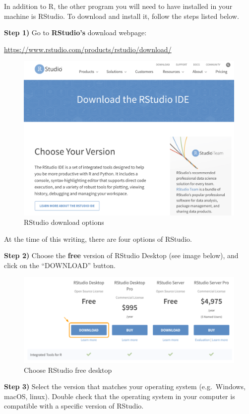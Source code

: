 \documentclass[
]{book}
\begin{document}
In addition to R, the other program you will need to have installed in your
machine is RStudio. To download and install it, follow the steps listed below.

\textbf{Step 1)} Go to \textbf{RStudio's} download webpage:

\url{https://www.rstudio.com/products/rstudio/download/}

\begin{figure}

{\centering \includegraphics[width=0.6\linewidth]{images/install/rstudio-download} 

}

\caption{RStudio download options}\label{fig:unnamed-chunk-10}
\end{figure}

At the time of this writing, there are four options of RStudio.

\textbf{Step 2)} Choose the \textbf{free} version of RStudio Desktop (see image below),
and click on the ``DOWNLOAD'' button.

\begin{figure}

{\centering \includegraphics[width=0.6\linewidth]{images/install/rstudio-free} 

}

\caption{Choose RStudio free desktop}\label{fig:unnamed-chunk-11}
\end{figure}

\textbf{Step 3)} Select the version that matches your operating system (e.g.~Windows,
macOS, linux). Double check that the operating system in your computer
is compatible with a specific version of RStudio.
\end{document}
